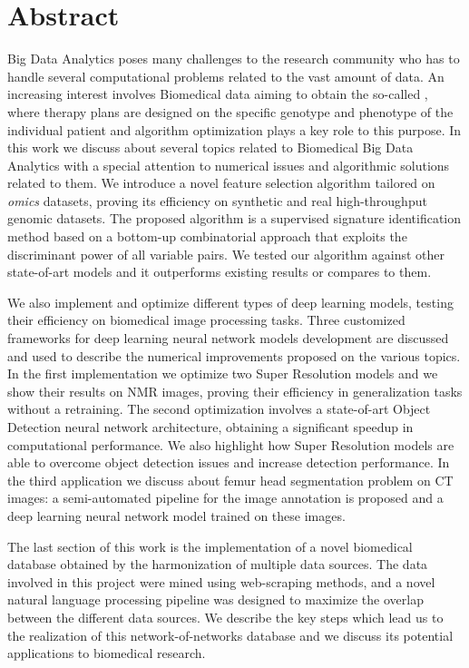 \documentclass{standalone}
\begin{document}
\chapter*{Abstract}

Big Data Analytics poses many challenges to the research community who has to handle several computational problems related to the vast amount of data.
An increasing interest involves Biomedical data aiming to obtain the so-called , where therapy plans are designed on the specific genotype and phenotype of the individual patient and algorithm optimization plays a key role to this purpose.
In this work we discuss about several topics related to Biomedical Big Data Analytics with a special attention to numerical issues and algorithmic solutions related to them.
We introduce a novel feature selection algorithm tailored on \emph{omics} datasets, proving its efficiency on synthetic and real high-throughput genomic datasets.
The proposed algorithm is a supervised signature identification method based on a bottom-up combinatorial approach that exploits the discriminant power of all variable pairs.
We tested our algorithm against other state-of-art models and it outperforms existing results or compares to them.

We also implement and optimize different types of deep learning models, testing their efficiency on biomedical image processing tasks.
Three customized frameworks for deep learning neural network models development are discussed and used to describe the numerical improvements proposed on the various topics.
In the first implementation we optimize two Super Resolution models and we show their results on NMR images, proving their efficiency in generalization tasks without a retraining.
The second optimization involves a state-of-art Object Detection neural network architecture, obtaining a significant speedup in computational performance.
We also highlight how Super Resolution models are able to overcome object detection issues and increase detection performance.
In the third application we discuss about femur head segmentation problem on CT images: a semi-automated pipeline for the image annotation is proposed and a deep learning neural network model trained on these images.

The last section of this work is the implementation of a novel biomedical database obtained by the harmonization of multiple data sources.
The data involved in this project were mined using web-scraping methods, and a novel natural language processing pipeline was designed to maximize the overlap between the different data sources.
We describe the key steps which lead us to the realization of this network-of-networks database and we discuss its potential applications to biomedical research.
\end{document}
